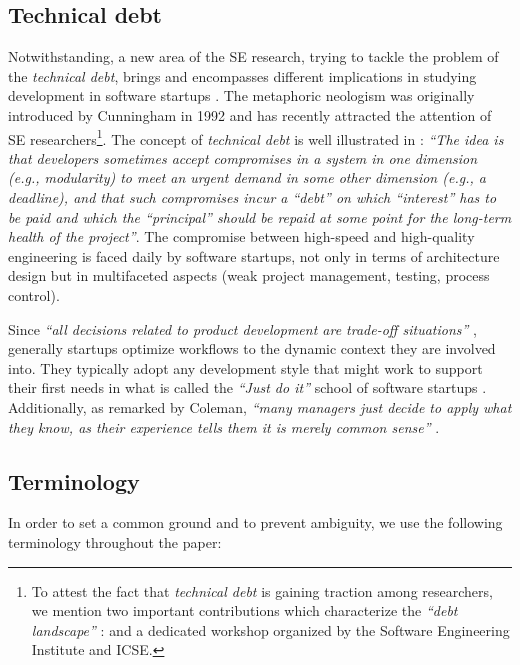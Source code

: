 \documentclass[12pt,journal,compsoc]{../sty/IEEEtran}
\begin{document}
\subsection{Technical debt} Notwithstanding, a new area of the SE research,
trying to tackle the problem of  the \textit{technical debt},  brings and
encompasses different implications in  studying development in software startups
\cite{Tom2013}. The metaphoric  neologism was originally introduced by
Cunningham in 1992  \cite{TechnicalDebtCunn} and has recently attracted the
attention of SE  researchers\footnote{To attest the fact that \textit{technical
debt} is gaining  traction among researchers, we mention two important
contributions which  characterize the \textit{``debt landscape''} :
\cite{Nugroho2011,Izurieta2012}  and a dedicated workshop \cite{workshopDebt}
organized by the Software  Engineering Institute  and ICSE.}. The concept of
\textit{technical debt} is  well illustrated in
\cite{Brown:2010:MTD:1882362.1882373} : \textit{``The idea  is that developers
sometimes accept compromises in a system in one dimension  (e.g., modularity) to
meet an urgent demand in some other dimension (e.g., a  deadline), and that such
compromises incur a ``debt'' on which ``interest'' has  to be paid and which the
``principal'' should be repaid at some point for the  long-term health of the
project''}.  The compromise between high-speed and  high-quality engineering is
faced daily by software startups, not only in terms  of architecture design but
in multifaceted aspects (weak project management,  testing, process control).

Since \textit{``all decisions related to product development are trade-off
situations''} \cite{Hilmola2003}, generally startups optimize workflows to the
dynamic context they are involved into. They typically adopt any development
style that might work to support their first needs in what is called the
\textit{``Just do it''} school of software startups \cite{Ries2011}.
Additionally, as remarked by Coleman, \textit{``many managers just decide to
apply what they know, as their experience tells them it is merely common
sense''} \cite{Coleman2008}.

\subsection{Terminology} In order to set a common ground and to prevent
ambiguity, we use the following  terminology throughout the paper:
\end{document}

